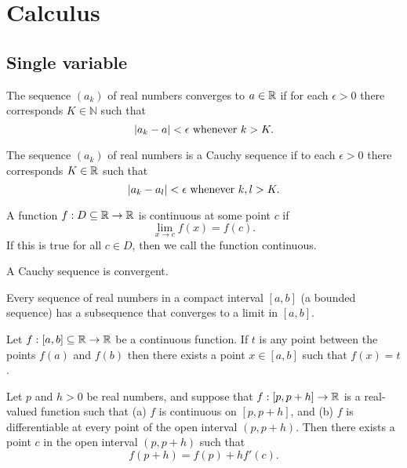 \documentclass{article}
\begin{document}
\section{Calculus}
\subsection{Single variable}
\begin{definition}
    The sequence $(a_k)$ of real numbers converges to $a \in \mathbb{R}$
    if for each $\epsilon > 0$ there corresponds $K \in \mathbb{N}$ such that
    \begin{equation*}
        \abs{a_k - a} < \epsilon \ \text{whenever} \ k > K.
    \end{equation*}
\end{definition}
\begin{definition}
    The sequence $(a_k)$ of real numbers is a Cauchy sequence if to each
    $\epsilon > 0$ there corresponds $K \in \mathbb{R}$ such that
    \begin{equation*}
        \abs{a_k - a_l} < \epsilon \ \text{whenever} \ k, l > K.
    \end{equation*}
\end{definition}
\begin{definition}
    A function $f: D \subseteq \mathbb{R} \rightarrow \mathbb{R}$ is continuous at some point $c$ if
    \begin{equation*}
        \lim_{x \rightarrow c} f(x) = f(c).
    \end{equation*}
    If this is true for all $c \in D$, then we call the function continuous.
\end{definition}
\begin{theorem}
    A Cauchy sequence is convergent.
\end{theorem}
\begin{theorem}
    Every sequence of real numbers in a compact interval $[a, b]$ (a bounded sequence)
    has a subsequence that converges to a limit in $[a, b]$.
\end{theorem}
\begin{theorem}
    Let $f: [a, b] \subseteq \mathbb{R} \rightarrow \mathbb{R}$ be a continuous function. If $t$ is any point between the points $f(a)$ and $f(b)$
    then there exists a point $x \in [a, b]$ such that $f(x) = t$.
\end{theorem}
\begin{theorem}
    Let $p$ and $h > 0$ be real numbers, and suppose that $f: [p, p + h] \rightarrow \mathbb{R}$
    is a real-valued function such that (a) $f$ is continuous on $[p, p + h]$, and (b) $f$ is differentiable
    at every point of the open interval $(p, p + h)$. Then there exists a point $c$ in the open interval
    $(p, p + h)$ such that
    \begin{equation*}
        f(p + h) = f(p) + hf'(c).
    \end{equation*}
\end{theorem}
\end{document}
